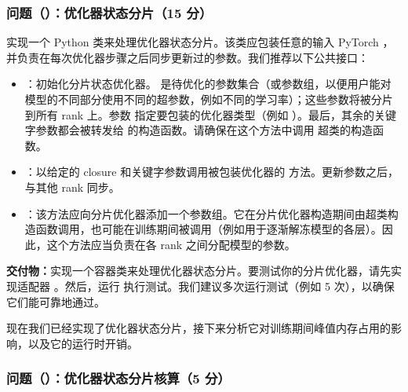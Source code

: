 \subsubsection*{问题（）：优化器状态分片（15 分）}

实现一个 Python 类来处理优化器状态分片。该类应包装任意的输入 PyTorch ，并负责在每次优化器步骤之后同步更新过的参数。我们推荐以下公共接口：

\begin{itemize}
  \item {}：初始化分片状态优化器。 是待优化的参数集合（或参数组，以便用户能对模型的不同部分使用不同的超参数，例如不同的学习率）；这些参数将被分片到所有 rank 上。参数  指定要包装的优化器类型（例如 ）。最后，其余的关键字参数都会被转发给  的构造函数。请确保在这个方法中调用  超类的构造函数。
  \item {}：以给定的 closure 和关键字参数调用被包装优化器的  方法。更新参数之后，与其他 rank 同步。
  \item {}：该方法应向分片优化器添加一个参数组。它在分片优化器构造期间由超类构造函数调用，也可能在训练期间被调用（例如用于逐渐解冻模型的各层）。因此，这个方法应当负责在各 rank 之间分配模型的参数。
\end{itemize}

\textbf{交付物：}实现一个容器类来处理优化器状态分片。要测试你的分片优化器，请先实现适配器 。然后，运行  执行测试。我们建议多次运行测试（例如 5 次），以确保它们能可靠地通过。

现在我们已经实现了优化器状态分片，接下来分析它对训练期间峰值内存占用的影响，以及它的运行时开销。

\subsubsection*{问题（）：优化器状态分片核算（5 分）}

